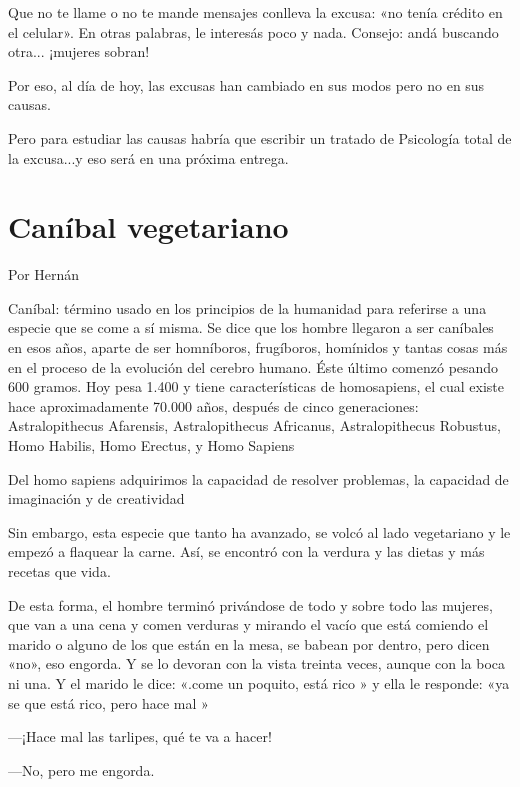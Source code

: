 \documentclass[11pt,twoside,openright,a5paper]{book}
\begin{document}
Que no te llame o no te mande mensajes conlleva la excusa: «no tenía crédito en el celular». En otras palabras, le interesás poco y nada. Consejo: andá buscando otra... ¡mujeres sobran!

Por eso, al día de hoy, las excusas han cambiado en sus modos pero no en sus causas. 

Pero para estudiar las causas habría que escribir un tratado de Psicología total de la excusa...y eso será en una próxima entrega.

\section*{Caníbal vegetariano}

                                                                                        \begin{flushright}Por Hernán\end{flushright}

Caníbal: término usado en los principios de la humanidad para referirse a una especie que se come a sí misma. Se dice que los hombre llegaron a ser caníbales en esos años, aparte de ser homníboros, frugíboros, homínidos y tantas cosas más en el proceso de la evolución del cerebro humano. Éste último comenzó pesando 600 gramos. Hoy pesa 1.400 y tiene características de homosapiens, el cual existe hace aproximadamente 70.000 años, después de cinco generaciones: Astralopithecus Afarensis,  Astralopithecus Africanus,  Astralopithecus Robustus,  Homo Habilis, Homo Erectus, y Homo Sapiens

Del homo sapiens adquirimos la  capacidad de resolver problemas,  la capacidad  de imaginación y de  creatividad 

Sin embargo, esta especie que tanto ha avanzado, se volcó al lado vegetariano y le empezó a flaquear la carne. Así, se encontró con la verdura y las dietas y más recetas que vida.

De esta forma,  el hombre terminó  privándose de todo  y sobre todo las mujeres, que van a una cena y comen verduras y mirando el vacío que está  comiendo el marido o alguno de los que están en la mesa, se babean por dentro,  pero dicen «no», eso engorda. Y se lo devoran con la vista treinta veces, aunque con la boca ni una. Y el marido le dice: «.come un poquito, está rico » y ella le responde: «ya se que está rico,  pero hace mal » 

---¡Hace mal las tarlipes, qué te  va a hacer!

---No, pero me engorda.
\end{document}
